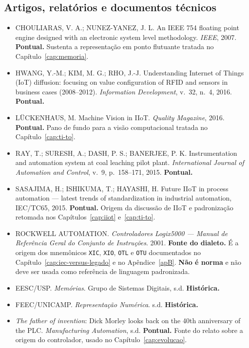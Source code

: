 \subsection{Artigos, relatórios e documentos técnicos}

\begin{itemize}[leftmargin=1.2cm, label={}]
  \item CHOULIARAS, V. A.; NUNEZ-YANEZ, J. L. An IEEE 754 floating point engine designed with an
        electronic system level methodology. \emph{IEEE}, 2007. \textbf{Pontual.} Sustenta a
        representação em ponto flutuante tratada no Capítulo~\ref{cap:memoria}.
  \item HWANG, Y.-M.; KIM, M. G.; RHO, J.-J. Understanding Internet of Things (IoT) diffusion:
        focusing on value configuration of RFID and sensors in business cases (2008--2012).
        \emph{Information Development}, v.~32, n.~4, 2016. \textbf{Pontual.}
  \item LÜCKENHAUS, M. Machine Vision in IIoT. \emph{Quality Magazine}, 2016. \textbf{Pontual.}
        Pano de fundo para a visão computacional tratada no Capítulo~\ref{cap:ti-to}.
  \item RAY, T.; SURESH, A.; DASH, P. S.; BANERJEE, P. K. Instrumentation and automation system at
        coal leaching pilot plant. \emph{International Journal of Automation and Control}, v.~9,
        p.~158--171, 2015. \textbf{Pontual.}
  \item SASAJIMA, H.; ISHIKUMA, T.; HAYASHI, H. Future IIoT in process automation --- latest trends
        of standardization in industrial automation, IEC/TC65, 2015. \textbf{Pontual.} Origem da
        discussão de IIoT e padronização retomada nos Capítulos~\ref{cap:iiot}
        e~\ref{cap:ti-to}.
  \item ROCKWELL AUTOMATION. \emph{Controladores Logix5000 --- Manual de Referência Geral do Conjunto
        de Instruções}. 2001. \textbf{Fonte do dialeto.} É a origem dos mnemônicos \texttt{XIC},
        \texttt{XIO}, \texttt{OTL} e \texttt{OTU} documentados no Capítulo~\ref{cap:iec-versus-legado}
        e no Apêndice~\ref{apB}. \textbf{Não é norma} e não deve ser usada como referência de
        linguagem padronizada.
  \item EESC/USP. \emph{Memórias}. Grupo de Sistemas Digitais, s.d. \textbf{Histórica.}
  \item FEEC/UNICAMP. \emph{Representação Numérica}. s.d. \textbf{Histórica.}
  \item \emph{The father of invention}: Dick Morley looks back on the 40th anniversary of the PLC.
        \emph{Manufacturing Automation}, s.d. \textbf{Pontual.} Fonte do relato sobre a origem do
        controlador, usado no Capítulo~\ref{cap:evolucao}.
\end{itemize}

